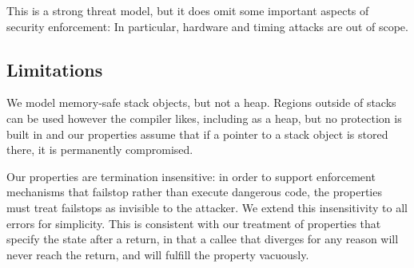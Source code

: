 This is a strong threat model, but it does omit some important aspects of
security enforcement: In particular, hardware and timing attacks are out of scope.

\subsection{Limitations}

We model memory-safe stack objects, but not a heap. Regions outside of
stacks can be used however the compiler likes, including as a heap, but no protection is
built in and our properties assume that if a pointer to a stack object is stored there,
it is permanently compromised.

Our properties are termination insensitive: in order to support enforcement mechanisms
that failstop rather than execute dangerous code, the properties must treat failstops
as invisible to the attacker. We extend this insensitivity to all errors for simplicity.
This is consistent with our treatment of properties that specify the state after a return,
in that a callee that diverges for any reason will never reach the return, and will fulfill
the property vacuously.
%


